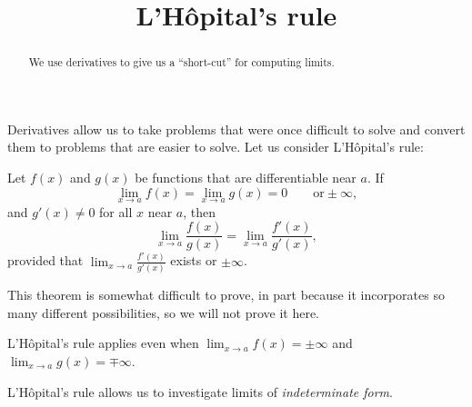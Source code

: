 \documentclass{ximera}
\title[Dig-In:]{L'H\^{o}pital's rule}
\begin{document}
\begin{abstract}
  We use derivatives to give us a ``short-cut'' for computing limits.
\end{abstract}
\maketitle

Derivatives allow us to take problems that were once difficult to
solve and convert them to problems that are easier to solve. Let us
consider L'H\^{o}pital's rule:

\begin{theorem} 
	Let $f(x)$ and $g(x)$ be functions that are differentiable near $a$.  If
	\[
	\lim_{x \to a} f(x) = \lim_{x \to a}g(x) = 0 \qquad \text{or} \pm \infty,
	\]
	 and $g'(x) \neq 0$
	for all $x$ near $a$, then 
	\[
	\lim_{x \to a} \frac{f(x)}{g(x)} = \lim_{x \to a} \frac{f'(x)}{g'(x)},
	\]
	provided that $\lim_{x \to a} \frac{f'(x)}{g'(x)}$ exists or $\pm \infty$.
\end{theorem}

This theorem is somewhat difficult to prove, in part because it
incorporates so many different possibilities, so we will not prove it
here. 
\begin{remark}
  L'H\^{o}pital's rule applies even when $\lim_{x\to a}f(x) = \pm \infty$
  and $\lim_{x\to a}g(x) = \mp \infty$.
\end{remark}


L'H\^{o}pital's rule allows us to investigate limits of \textit{indeterminate form}.
\end{document}
